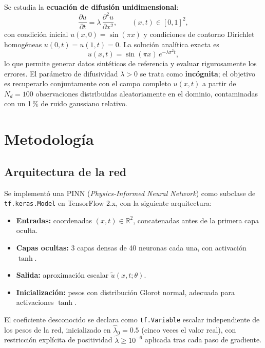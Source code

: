 \documentclass[12pt,a4paper]{article}
\newcommand{\lhat}{\hat{\lambda}}
\begin{document}
Se estudia la \textbf{ecuación de difusión unidimensional}:
\begin{equation}
  \frac{\partial u}{\partial t} = \lambda\,\frac{\partial^2 u}{\partial x^2},
  \qquad (x,t)\in[0,1]^2,
  \label{eq:difusion}
\end{equation}
con condición inicial $u(x,0)=\sin(\pi x)$ y condiciones de contorno Dirichlet homogéneas
$u(0,t)=u(1,t)=0$. La solución analítica exacta es
\begin{equation}
  u(x,t)=\sin(\pi x)\,e^{-\lambda\pi^2 t},
  \label{eq:analitica}
\end{equation}
lo que permite generar datos sintéticos de referencia y evaluar rigurosamente los errores.
El parámetro de difusividad $\lambda>0$ se trata como \textbf{incógnita}; el objetivo es
recuperarlo conjuntamente con el campo completo $u(x,t)$ a partir de $N_d=100$
observaciones distribuidas aleatoriamente en el dominio, contaminadas con un 1\,\% de
ruido gaussiano relativo.

\section{Metodología}

\subsection{Arquitectura de la red}

Se implementó una PINN (\textit{Physics-Informed Neural Network}) como subclase de
\texttt{tf.keras.Model} en TensorFlow 2.x, con la siguiente arquitectura:
\begin{itemize}
  \item \textbf{Entradas:} coordenadas $(x,t)\in\mathbb{R}^2$, concatenadas antes de la
        primera capa oculta.
  \item \textbf{Capas ocultas:} 3 capas densas de 40 neuronas cada una, con activación
        $\tanh$.
  \item \textbf{Salida:} aproximación escalar $\tilde{u}(x,t;\theta)$.
  \item \textbf{Inicialización:} pesos con distribución Glorot normal, adecuada para
        activaciones $\tanh$.
\end{itemize}

El coeficiente desconocido se declara como \texttt{tf.Variable} escalar independiente de
los pesos de la red, inicializado en $\lhat_0=0.5$ (cinco veces el valor real), con
restricción explícita de positividad $\lhat\geq10^{-6}$ aplicada tras cada paso de
gradiente.
\end{document}
